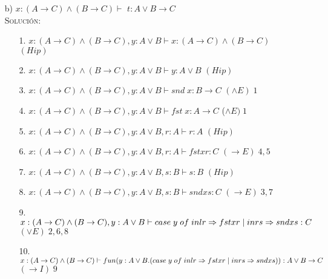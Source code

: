 \documentclass[letterpaper,12pt]{article}
\begin{document}
\begin{enumerate}
    \item[b)] $x: (A \rightarrow C) \land (B \rightarrow C) \vdash$
    $t: A \lor B \rightarrow C$ \\
    \textsc{Solución:}
    \begin{enumerate}
        \item[1.] $x: (A \rightarrow C) \land (B \rightarrow C), 
        y: A \lor B \vdash x: (A \rightarrow C) \land (B \rightarrow C)$
        \; \; \; \; \; $(Hip)$
        \item[2.] $x: (A \rightarrow C) \land (B \rightarrow C), 
        y: A \lor B \vdash y: A \lor B$ \; \; \; \; \; \; \; \; \; \; \; \; \; \; \; \;$(Hip)$
        \item[3.] $x: (A \rightarrow C) \land (B \rightarrow C), 
        y: A \lor B \vdash snd \; x: B \rightarrow C$ \; \; \; \; \; \; \; \; \; \; \; \; $(\land E) \; 1$
        \item[4.] $x: (A \rightarrow C) \land (B \rightarrow C), 
        y: A \lor B \vdash fst \; x: A \rightarrow C$ \; \; \; \; \; \; \; \; \; \; \; \; \;($\land E) \; 1$
        \item[5.] $x: (A \rightarrow C) \land (B \rightarrow C), 
        y: A \lor B, r: A \vdash r: A$ \; \; \; \; \; \; \; \; \; \; \; \; \; \; \; $(Hip)$
        \item[6.] $x: (A \rightarrow C) \land (B \rightarrow C), 
        y: A \lor B, r: A \vdash fstxr: C$ \; \; \; \; \; \; \; \; \; \; \; \; $(\rightarrow E) \; 4,5$ 
        \item[7.] $x: (A \rightarrow C) \land (B \rightarrow C), 
        y: A \lor B, s: B \vdash s: B$ \; \; \; \; \; \; \; \; \; \; \; \; \; \; \; \;$(Hip)$ 
        \item[8.] $x: (A \rightarrow C) \land (B \rightarrow C), 
        y: A \lor B, s: B \vdash sndxs: C$ \; \; \; \; \; \; \; \; \; \; \; \; $(\rightarrow E) \; 3,7$
        \item[9.] $x: (A \rightarrow C) \land (B \rightarrow C), 
        y: A \lor B \vdash \\ 
        case \; y \; of \; inl r \Rightarrow fstx r\; | \; inr s \Rightarrow snd xs : C$ \; \; \; \;\; \; \; \; \; \; \; \; \; \; \; \; \; \; \; \;$(\lor E) \; 2, 6, 8$
        \item[10.] $x: (A \rightarrow C) \land (B \rightarrow C) \vdash \\ 
        fun(y: A \lor B.(case \; y \; of \; inl r \Rightarrow fstxr\; | \; inrs \Rightarrow sndxs)) : A \lor B \rightarrow C$ \; \;$(\rightarrow I)\; 9$
    \end{enumerate}


\end{enumerate}
\end{document}
